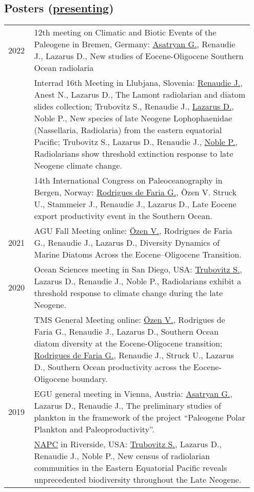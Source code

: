 \documentclass[11pt, a4paper]{article}
\begin{document}
\subsection[Posters]{Posters \textnormal{\footnotesize{(\underline{presenting})}}}
\begin{longtable}{@{}p{0.1\linewidth} P{0.85\linewidth}@{}}
2022 & 12th meeting on Climatic and Biotic Events of the Paleogene in Bremen, Germany: \underline{Asatryan G.}, Renaudie J., Lazarus D., New studies of Eocene-Oligocene Southern Ocean radiolaria\\
& Interrad 16th Meeting in Llubjana, Slovenia: \underline{Renaudie J.}, Anest N., Lazarus D., The Lamont radiolarian and diatom slides collection; Trubovitz S., Renaudie J., \underline{Lazarus D.}, Noble P., New species of late Neogene Lophophaenidae (Nassellaria, Radiolaria) from the eastern equatorial Pacific; Trubovitz S., Lazarus D., Renaudie J., \underline{Noble P.}, Radiolarians show threshold extinction response to late Neogene climate change.\\
& 14th International Congress on Paleoceanography in Bergen, Norway: \underline{Rodrigues de Faria G.}, Özen V. Struck U., Stammeier J., Renaudie J., Lazarus D., Late Eocene export productivity event in the Southern Ocean.\\
2021 & AGU Fall Meeting online: \underline{Özen V.}, Rodrigues de Faria G., Renaudie J., Lazarus D., Diversity Dynamics of Marine Diatoms Across the Eocene--Oligocene Transition.\\
2020 & Ocean Sciences meeting in San Diego, USA: \underline{Trubovitz S.}, Lazarus D., Renaudie J., Noble P., Radiolarians exhibit a threshold response to climate change during the late Neogene.\\
 & TMS General Meeting online: \underline{\"{O}zen V.}, Rodrigues de Faria G., Renaudie J., Lazarus D., Southern Ocean diatom diversity at the Eocene-Oligocene transition; \underline{Rodrigues de Faria G.}, Renaudie J., Struck U., Lazarus D., Southern Ocean productivity across the Eocene-Oligocene boundary.\\
2019 & EGU general meeting in Vienna, Austria: \underline{Asatryan G.}, Lazarus D., Renaudie J., The preliminary studies of plankton in the framework of the project ``Paleogene Polar Plankton and Paleoproductivity''.\\
& \href{https://escholarship.org/uc/item/6r18f8wn}{NAPC} in Riverside, USA: \underline{Trubovitz S.}, Lazarus D., Renaudie J., Noble P., New census of radiolarian communities in the Eastern Equatorial Pacific reveals unprecedented biodiversity throughout the Late Neogene.\\

\end{longtable}
\end{document}
